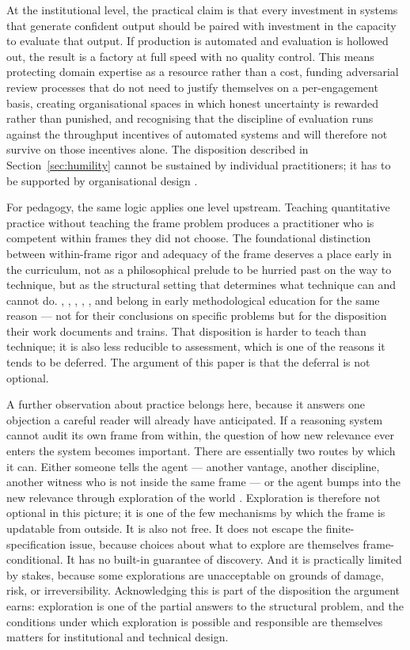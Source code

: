 \documentclass[11pt,a4paper]{article}
\begin{document}
At the institutional level, the practical claim is that every
investment in systems that generate confident output should be paired
with investment in the capacity to evaluate that output. If production
is automated and evaluation is hollowed out, the result is a factory at
full speed with no quality control. This means protecting domain
expertise as a resource rather than a cost, funding adversarial review
processes that do not need to justify themselves on a per-engagement
basis, creating organisational spaces in which honest uncertainty is
rewarded rather than punished, and recognising that the discipline of
evaluation runs against the throughput incentives of automated systems
and will therefore not survive on those incentives alone. The
disposition described in Section~\ref{sec:humility} cannot be sustained
by individual practitioners; it has to be supported by organisational
design \citep{Vaughan1996,KingKay2020}.

For pedagogy, the same logic applies one level upstream. Teaching
quantitative practice without teaching the frame problem produces a
practitioner who is competent within frames they did not choose. The
foundational distinction between within-frame rigor and adequacy of the
frame deserves a place early in the curriculum, not as a philosophical
prelude to be hurried past on the way to technique, but as the
structural setting that determines what technique can and cannot do.
\citet{Box1976}, \citet{Knight1921}, \citet{Jaynes2003}, \citet{Pearl1988},
\citet{WolpertMacready1997}, and \citet{Spiegelhalter2019} belong in
early methodological education for the same reason --- not for their
conclusions on specific problems but for the disposition their work
documents and trains. That disposition is harder to teach than
technique; it is also less reducible to assessment, which is one of the
reasons it tends to be deferred. The argument of this paper is that the
deferral is not optional.

A further observation about practice belongs here, because it answers
one objection a careful reader will already have anticipated. If a
reasoning system cannot audit its own frame from within, the question
of how new relevance ever enters the system becomes important. There
are essentially two routes by which it can. Either someone tells the
agent --- another vantage, another discipline, another witness who is
not inside the same frame --- or the agent bumps into the new relevance
through exploration of the world
\citep{SuttonBarto2018,RussellS2019}. Exploration is therefore not
optional in this picture; it is one of the few mechanisms by which the
frame is updatable from outside. It is also not free. It does not
escape the finite-specification issue, because choices about what to
explore are themselves frame-conditional. It has no built-in guarantee
of discovery. And it is practically limited by stakes, because some
explorations are unacceptable on grounds of damage, risk, or
irreversibility. Acknowledging this is part of the disposition the
argument earns: exploration is one of the partial answers to the
structural problem, and the conditions under which exploration is
possible and responsible are themselves matters for institutional and
technical design.
\end{document}
